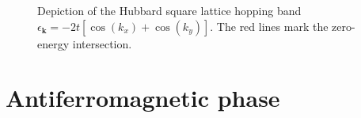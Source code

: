 %

\begin{figure}
	\centering
%	
	\caption{Depiction of the Hubbard square lattice hopping band $\epsilon_{\mathbf{k}} = -2t[\cos(k_x) + \cos(k_y)]$. The red lines mark the zero-energy intersection.}
	\label{appfig:ferromagnetic-3d-band}
\end{figure}

\section{Antiferromagnetic phase}\label{appsec:antiferromagnetic-phase}

